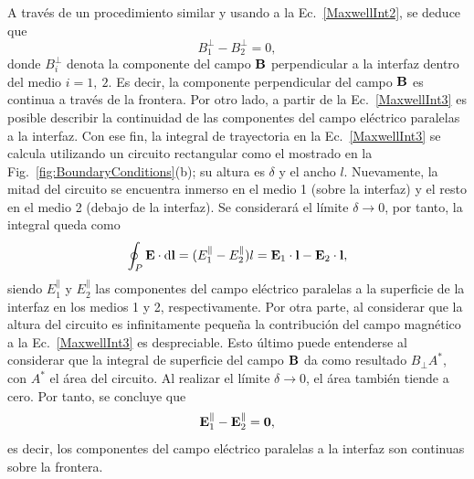 A través de un procedimiento similar y usando a la Ec.~\eqref{MaxwellInt2}, se deduce que~\cite{griffiths2013electrodynamics}
\begin{equation}
B_{1}^{\perp}-B_{2}^{\perp}=0,
\end{equation}
donde $B_{i}^{\perp}$ denota la componente del campo $\vb{B}$ perpendicular a la interfaz dentro del medio $i=1,\:2$. Es decir, la componente perpendicular del campo $\vb{B}$ es continua a través de la frontera. Por otro lado, a partir de la Ec.~\eqref{MaxwellInt3} es posible describir la continuidad de las componentes del campo eléctrico paralelas a la interfaz. Con ese fin, la integral de trayectoria en la Ec.~\eqref{MaxwellInt3} se calcula utilizando un circuito rectangular como el mostrado en la Fig.~\ref{fig:BoundaryConditions}(b); su altura  es $\delta$ y el ancho $l$. Nuevamente, la mitad del circuito se encuentra inmerso en el medio 1 (sobre la interfaz) y el resto en el medio 2 (debajo de la interfaz). Se considerará el límite $\delta\to0$, por tanto, la integral queda como
\begin{equation}
\oint_{P}\vb{E}\cdot\dd{\vb{l}}=(E_{1}^{\parallel}-E_{2}^{\parallel})l=\vb{E}_{1}\cdot\vb{l}-\vb{E}_{2}\cdot\vb{l},
\end{equation}
siendo $E_{1}^{\parallel}$ y $E_{2}^{\parallel}$ las componentes del campo eléctrico paralelas a la superficie de la interfaz en los medios 1 y 2, respectivamente. Por otra parte, al considerar que la altura del circuito es infinitamente pequeña la contribución del campo magnético a la Ec.~\eqref{MaxwellInt3} es despreciable. Esto último puede entenderse al considerar que la integral de superficie del campo $\vb{B}$ da como resultado $B_{\perp}A^{*}$, con $A^{*}$ el área del circuito. Al realizar el límite $\delta\to0$, el área también tiende a cero. Por tanto, se concluye que~\cite{griffiths2013electrodynamics}
\begin{equation}
\vb{E}^{\parallel}_{1}-\vb{E}^{\parallel}_{2}=\vb{0},
\end{equation}
es decir, los componentes del campo eléctrico paralelas a la interfaz son continuas sobre la frontera. \\

